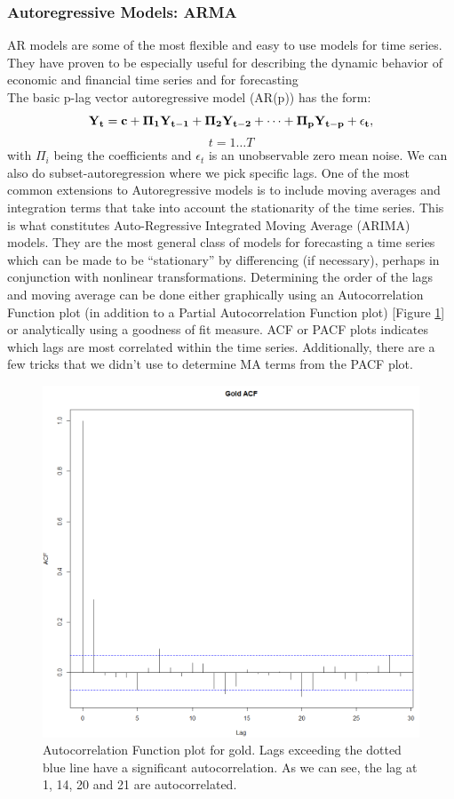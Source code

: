 \subsubsection{Autoregressive Models: ARMA}
AR models are some of the most flexible and easy to use models for time series. They have proven to be especially useful for describing the dynamic behavior of economic and financial time series and for forecasting \cite{tsay, VAR}  \\
The basic p-lag vector autoregressive model (AR(p)) has the form: $$\bf{Y}_t=\bf{c}+\bf{\Pi}_1\bf{Y}_{t-1}+\bf{\Pi}_2\bf{Y}_{t-2}+\cdots+\bf{\Pi}_p\bf{Y}_{t-p}+\epsilon_t,$$ $$t=1\ldots T$$ with $\Pi_i$ being the coefficients and $\epsilon_t$ is an unobservable zero mean noise. We can also do subset-autoregression where we pick specific lags.
One of the most common extensions to Autoregressive models is to include moving averages and integration terms that take into account the stationarity of the time series. This is what constitutes Auto-Regressive Integrated Moving Average (ARIMA) models. They are  the most general class of models for forecasting a time series which can be made to be “stationary” by differencing (if necessary), perhaps in conjunction with nonlinear transformations. 
Determining the order of the lags and moving average can be done either graphically using an Autocorrelation Function plot (in addition to a Partial Autocorrelation Function plot) [Figure \ref{fig:ACF}] or analytically using a goodness of fit measure. ACF or PACF plots indicates which lags are most correlated within the time series. Additionally, there are a few tricks that we didn't use to determine MA terms from the PACF plot.
\begin{figure}[ht]
	\vskip 0.2in
	\begin{center}
		\centerline{\includegraphics[width=\columnwidth]{ACF.png}}
		\caption{Autocorrelation Function plot for gold. Lags exceeding the dotted blue line have a significant autocorrelation. As we can see, the lag at 1, 14, 20 and 21 are autocorrelated.}
	\end{center}
	\vskip -0.2in
	\label{fig:ACF}
\end{figure}
